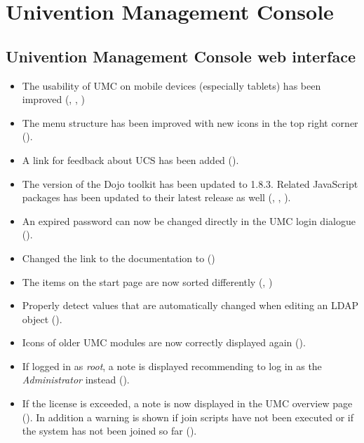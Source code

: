 \section{Univention Management Console}

\subsection{Univention Management Console web interface}
\begin{itemize}
\item The usability of UMC on mobile devices (especially tablets) has been
  improved (, , )

\item The menu structure has been improved with new icons in the top right
  corner ().

\item A link for feedback about UCS has been added ().

\item The version of the Dojo toolkit has been updated to 1.8.3. Related
  JavaScript packages has been updated to their latest release as well
  (, , ).

\item An expired password can now be changed directly in the UMC login dialogue
  ().

\item Changed the link to the documentation to  ()

\item The items on the start page are now sorted differently (, )

\item Properly detect values that are automatically changed when
  editing an LDAP object ().

\item Icons of older UMC modules are now correctly displayed again ().

\item If logged in as \emph{root}, a note is displayed recommending to
  log in as the \emph{Administrator} instead ().

\item If the license is exceeded, a note is now displayed in the UMC overview
  page (). In addition a warning is shown if join scripts have
  not been executed or if the system has not been joined so far
  ().


\end{itemize}
